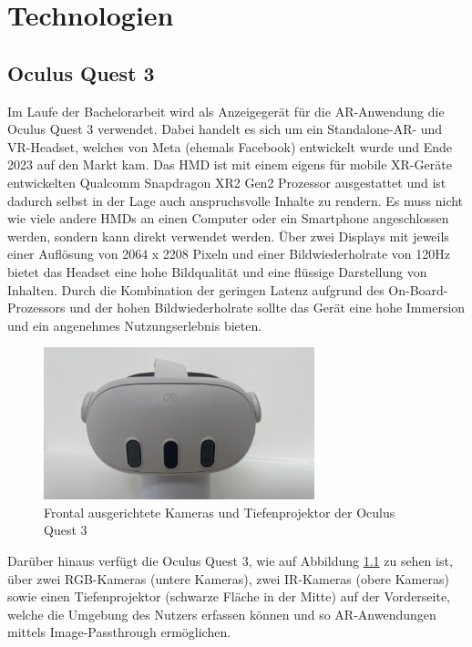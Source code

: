 \chapter{Technologien}

\section{Oculus Quest 3}

Im Laufe der Bachelorarbeit wird als Anzeigegerät für die AR-Anwendung die Oculus Quest 3 verwendet.
Dabei handelt es sich um ein Standalone-AR- und VR-Headset, welches von Meta (ehemals Facebook) entwickelt wurde und Ende 2023 auf den Markt kam.
Das HMD ist mit einem eigens für mobile XR-Geräte entwickelten Qualcomm Snapdragon XR2 Gen2 Prozessor ausgestattet und ist dadurch selbst in der Lage auch anspruchsvolle Inhalte zu rendern.
Es muss nicht wie viele andere HMDs an einen Computer oder ein Smartphone angeschlossen werden, sondern kann direkt verwendet werden.
Über zwei Displays mit jeweils einer Auflösung von 2064 x 2208 Pixeln und einer Bildwiederholrate von 120Hz bietet das Headset eine hohe Bildqualität und eine flüssige Darstellung von Inhalten.
Durch die Kombination der geringen Latenz aufgrund des On-Board-Prozessors und der hohen Bildwiederholrate sollte das Gerät eine hohe Immersion und ein angenehmes Nutzungserlebnis bieten.
\begin{figure}[H]
  \centering
  \includegraphics[width=0.7\textwidth]{images/Oculus-FrontCameras.jpg}
  \caption{Frontal ausgerichtete Kameras und Tiefenprojektor der Oculus Quest 3}
  \label{fig:quest-front-cameras}
\end{figure}
Darüber hinaus verfügt die Oculus Quest 3, wie auf Abbildung \ref{fig:quest-front-cameras} zu sehen ist, über zwei RGB-Kameras (untere Kameras), zwei IR-Kameras (obere Kameras) sowie einen Tiefenprojektor (schwarze Fläche in der Mitte) auf der Vorderseite, welche die Umgebung des Nutzers erfassen können und so AR-Anwendungen mittels Image-Passthrough ermöglichen.
